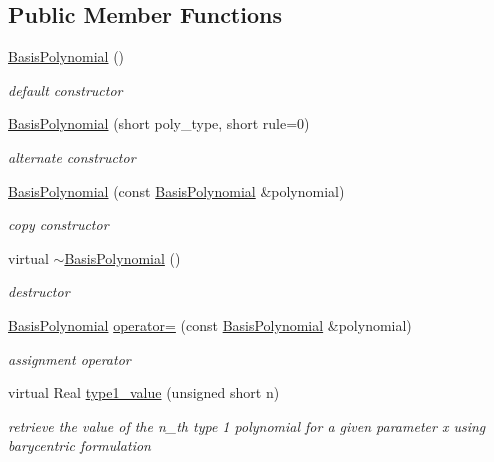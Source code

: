 \subsection*{Public Member Functions}
\begin{DoxyCompactItemize}
\item 
\hyperlink{classPecos_1_1BasisPolynomial_a1e7f67828439e4044ba18c5b9ffe01c1}{Basis\+Polynomial} ()
\begin{DoxyCompactList}\small\item\em default constructor \end{DoxyCompactList}\item 
\hyperlink{classPecos_1_1BasisPolynomial_a321d05f6c985a7bb96bca1dc7e9460ce}{Basis\+Polynomial} (short poly\+\_\+type, short rule=0)
\begin{DoxyCompactList}\small\item\em alternate constructor \end{DoxyCompactList}\item 
\hyperlink{classPecos_1_1BasisPolynomial_a2c5e3388a9ea8cc44540efa900cc9069}{Basis\+Polynomial} (const \hyperlink{classPecos_1_1BasisPolynomial}{Basis\+Polynomial} \&polynomial)
\begin{DoxyCompactList}\small\item\em copy constructor \end{DoxyCompactList}\item 
virtual \hyperlink{classPecos_1_1BasisPolynomial_a9f799c229d1bdd891577e8840110aa0d}{$\sim$\+Basis\+Polynomial} ()
\begin{DoxyCompactList}\small\item\em destructor \end{DoxyCompactList}\item 
\hyperlink{classPecos_1_1BasisPolynomial}{Basis\+Polynomial} \hyperlink{classPecos_1_1BasisPolynomial_a662cf89a3c1958de60111435fd6c28d7}{operator=} (const \hyperlink{classPecos_1_1BasisPolynomial}{Basis\+Polynomial} \&polynomial)
\begin{DoxyCompactList}\small\item\em assignment operator \end{DoxyCompactList}\item 
virtual Real \hyperlink{classPecos_1_1BasisPolynomial_a5f87c364dcb43473f02b99b090d99cbb}{type1\+\_\+value} (unsigned short n)
\begin{DoxyCompactList}\small\item\em retrieve the value of the n\+\_\+th type 1 polynomial for a given parameter x using barycentric formulation \end{DoxyCompactList}\item 

\end{DoxyCompactItemize}
